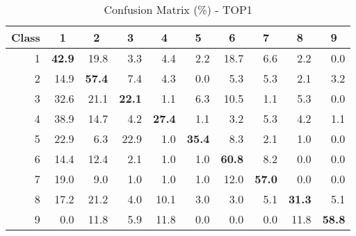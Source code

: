 \documentclass{article}[14pt, oneside, a4paper, times]
\begin{document}
\begin{table} [ht!]
\caption {Confusion Matrix (\%) - TOP1}
\begin{center}
\begin{tabular}{rrrrrrrrrr} \hline 
 \multicolumn{1}{c}{Class}&
 \multicolumn{1}{c}{1}&
 \multicolumn{1}{c}{2}&
 \multicolumn{1}{c}{3}&
 \multicolumn{1}{c}{4}&
 \multicolumn{1}{c}{5}&
 \multicolumn{1}{c}{6}&
 \multicolumn{1}{c}{7}&
 \multicolumn{1}{c}{8}&
 \multicolumn{1}{c}{9} \\ \hline

1 & \textbf{42.9}	&	19.8	&	3.3	 &	4.4	&	2.2	&	18.7&	6.6	&	2.2	&	0.0 \\
2 & 14.9	&	\textbf{57.4}	&	7.4	 &	4.3	&	0.0	&	5.3	&	5.3	&	2.1	&	3.2\\
3 & 32.6	&	21.1	&	\textbf{22.1} &	1.1	&	6.3	&	10.5&	1.1	&	5.3	&	0.0\\
4 & 38.9	&	14.7	&	4.2	 &	\textbf{27.4}&	1.1	&	3.2	&	5.3	&	4.2	&	1.1\\
5 & 22.9	&	6.3	    &	22.9 &	1.0	&	\textbf{35.4}&	8.3	&	2.1	&	1.0	&	0.0\\
6 & 14.4	&	12.4	&	2.1	 &	1.0	&	1.0	&	\textbf{60.8}&	8.2	&	0.0	&	0.0\\
7 & 19.0	&	9.0	    &	1.0	 &	1.0	&	1.0	&	12.0&	\textbf{57.0}&	0.0	&	0.0\\
8 & 17.2	&	21.2	&	4.0	 &	10.1&	3.0	&	3.0	&	5.1	&	\textbf{31.3}&	5.1\\
9 & 0.0	    &	11.8	&	5.9	 &	11.8&	0.0	&	0.0	&	0.0	&	11.8&	\textbf{58.8}\\ \hline

\end{tabular}
\label{top1:tab}
\end{center}
\end{table}
\end{document}
